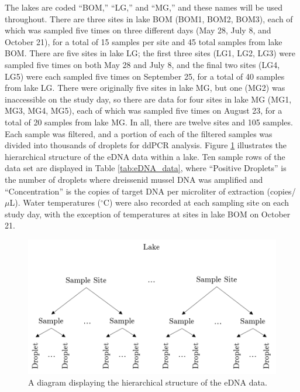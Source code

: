 \documentclass[12pt]{article}\usepackage[]{graphicx}\usepackage[]{color}
\begin{document}
The lakes are coded ``BOM,'' ``LG,'' and ``MG,'' and these names will be used throughout. There are three sites in lake BOM (BOM1, BOM2, BOM3), each of which was sampled five times on three different days (May 28, July 8, and October 21), for a total of 15 samples per site and 45 total samples from lake BOM. There are five sites in lake LG; the first three sites (LG1, LG2, LG3) were sampled five times on both May 28 and July 8, and the final two sites (LG4, LG5) were each sampled five times on September 25, for a total of 40 samples from lake LG. There were originally five sites in lake MG, but one (MG2) was inaccessible on the study day, so there are data for four sites in lake MG (MG1, MG3, MG4, MG5), each of which was sampled five times on August 23, for a total of 20 samples from lake MG. In all, there are twelve sites and 105 samples. Each sample was filtered, and a portion of each of the filtered samples was divided into thousands of droplets for ddPCR analysis. Figure \ref{fig:eDNA_diagram} illustrates the hierarchical structure of the eDNA data within a lake. Ten sample rows of the data set are displayed in Table \ref{tab:eDNA_data}, where ``Positive Droplets'' is the number of droplets where dreissenid mussel DNA was amplified and ``Concentration'' is the copies of target DNA per microliter of extraction (copies/$\mu$L). Water temperatures ($^\circ$C) were also recorded at each sampling site on each study day, with the exception of temperatures at sites in lake BOM on October 21. 

\begin{figure}[]
	\centering
	\includegraphics[scale = 0.7]{images/eDNA}
	\caption{A diagram displaying the hierarchical structure of the eDNA data.}
	\label{fig:eDNA_diagram}
\end{figure}
\end{document}
